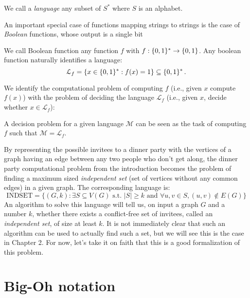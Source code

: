 \begin{definition}[Language]
	We call a \emph{language} any subset of $S^*$ where $S$ is an alphabet.
\end{definition}
An important special case of functions mapping strings to strings is the case of \emph{Boolean} functions, whose output is a single bit
\begin{definition}
	We call Boolean function any function $f$ with $f : \{ 0,1 \}^*  \to \{ 0,1 \} $. Any boolean function naturally identifies a language:
	\begin{equation}
		\mathcal{L}_f = \{ x \in \{ 0,1 \}^*  : f(x) = 1 \} \subseteq \{ 0,1 \}^*  \, .
		\label{eq:boolean-func-language}
	\end{equation}
\end{definition}
We identify the computational problem of computing $f$ (i.e., given $x$ compute $f(x)$) with the problem of deciding the language $\mathcal{L}_f$ (i.e., given $x$, decide whether $x \in \mathcal{L}_f$):
\begin{definition}
	A decision problem for a given language $\mathcal{M}$ can be seen as the task of computing $f$ such that $\mathcal{M} = \mathcal{L}_f$.
\end{definition}


\begin{eg}[INDSET]
	By representing the possible invitees to a dinner party with the vertices of a graph having an edge between any two people who don't get along, the dinner party computational problem from the introduction becomes the problem of finding a maximum sized \emph{independent set} (set of vertices without any common edges) in a given graph. The corresponding language is:
	\[
		\text{INDSET} = \{(G,k): \exists S \subseteq V(G) \text{ s.t. } |S| \geq k \text{ and } \forall u,v \in S, (u,v) \notin E(G)\}
	\]
	An algorithm to solve this language will tell us, on input a graph $G$ and a number $k$, whether there exists a conflict-free set of invitees, called an \emph{independent set}, of size at least $k$. It is not immediately clear that such an algorithm can be used to actually find such a set, but we will see this is the case in Chapter 2. For now, let's take it on faith that this is a good formalization of this problem.
\end{eg}

\section{Big-Oh notation}

